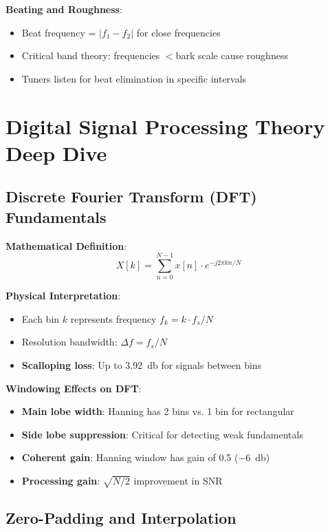 \documentclass[11pt,a4paper]{article}
\begin{document}
\textbf{Beating and Roughness}:
\begin{itemize}
    \item Beat frequency = $|f_1 - f_2|$ for close frequencies
    \item Critical band theory: frequencies $<$bark scale cause roughness
    \item Tuners listen for beat elimination in specific intervals
\end{itemize}

\section{Digital Signal Processing Theory Deep Dive}

\subsection{Discrete Fourier Transform (DFT) Fundamentals}

\textbf{Mathematical Definition}:
\begin{equation}
X[k] = \sum_{n=0}^{N-1} x[n] \cdot e^{-j2\pi kn/N}
\end{equation}

\textbf{Physical Interpretation}:
\begin{itemize}
    \item Each bin $k$ represents frequency $f_k = k \cdot f_s / N$
    \item Resolution bandwidth: $\Delta f = f_s / N$
    \item \textbf{Scalloping loss}: Up to \SI{3.92}{\decibel} for signals between bins
\end{itemize}

\textbf{Windowing Effects on DFT}:
\begin{itemize}
    \item \textbf{Main lobe width}: Hanning has 2 bins vs. 1 bin for rectangular
    \item \textbf{Side lobe suppression}: Critical for detecting weak fundamentals
    \item \textbf{Coherent gain}: Hanning window has gain of 0.5 (\SI{-6}{\decibel})
    \item \textbf{Processing gain}: $\sqrt{N/2}$ improvement in SNR
\end{itemize}

\subsection{Zero-Padding and Interpolation}
\end{document}
